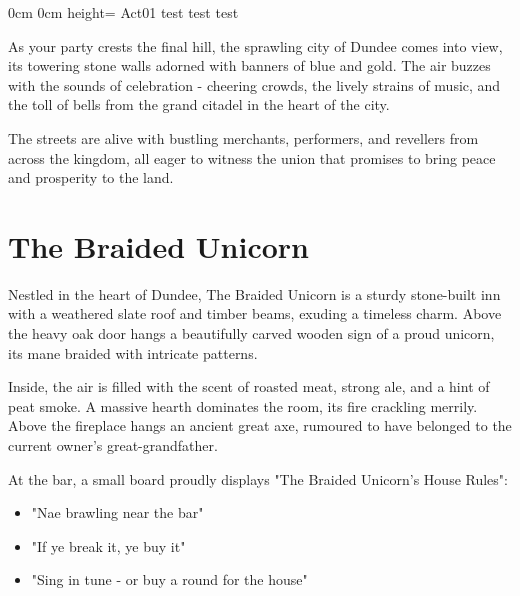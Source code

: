 	{}%
	{0cm}%
	{0cm}%
	{height=\paperheight}%
	{Act01}%
	{test}%
	{test}%
	{test}%



\vspace*{-0.5em}\begin{DndReadAloud}
	As your party crests the final hill, the sprawling city of Dundee comes into view, its towering stone walls adorned with banners of blue and gold. The air buzzes with the sounds of celebration - cheering crowds, the lively strains of music, and the toll of bells from the grand citadel in the heart of the city.
	
	The streets are alive with bustling merchants, performers, and revellers from across the kingdom, all eager to witness the union that promises to bring peace and prosperity to the land.
\end{DndReadAloud}

\section*{The Braided Unicorn}
{\entryfont Nestled in the heart of Dundee, The Braided Unicorn is a sturdy stone-built inn with a weathered slate roof and timber beams, exuding a timeless charm. Above the heavy oak door hangs a beautifully carved wooden sign of a proud unicorn, its mane braided with intricate patterns.

Inside, the air is filled with the scent of roasted meat, strong ale, and a hint of peat smoke. A massive hearth dominates the room, its fire crackling merrily. Above the fireplace hangs an ancient great axe, rumoured to have belonged to the current owner's great-grandfather.

At the bar, a small board proudly displays "The Braided Unicorn's House Rules":
\begin{itemize}
	\item "Nae brawling near the bar"
	\item "If ye break it, ye buy it"
	\item "Sing in tune - or buy a round for the house"
\end{itemize}}

